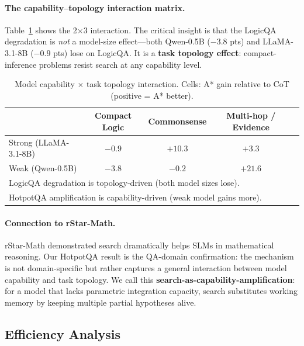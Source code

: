 \documentclass[11pt]{article}
\begin{document}
\paragraph{The capability--topology interaction matrix.}
Table~\ref{tab:interaction} shows the 2$\times$3 interaction. The critical insight is that the LogicQA degradation is \emph{not} a model-size effect—both Qwen-0.5B ($-3.8$ pts) and LLaMA-3.1-8B ($-0.9$ pts) lose on LogicQA. It is a \textbf{task topology effect}: compact-inference problems resist search at any capability level.

\begin{table}[t]
\centering
\caption{Model capability $\times$ task topology interaction. Cells: A* gain relative to CoT (positive = A* better).}
\label{tab:interaction}
\small
\begin{tabular}{lcccc}
\toprule
& \textbf{Compact Logic} & \textbf{Commonsense} & \textbf{Multi-hop / Evidence} \\
\midrule
Strong (LLaMA-3.1-8B) & $-0.9$ & $+10.3$ & $+3.3$ \\
Weak (Qwen-0.5B)      & $-3.8$ & $-0.2$  & $+21.6$ \\
\midrule
\multicolumn{4}{l}{\small LogicQA degradation is topology-driven (both model sizes lose).} \\
\multicolumn{4}{l}{\small HotpotQA amplification is capability-driven (weak model gains more).} \\
\bottomrule
\end{tabular}
\end{table}

\paragraph{Connection to rStar-Math.}
rStar-Math \citep{guan2025rstar} demonstrated search dramatically helps SLMs in mathematical reasoning. Our HotpotQA result is the QA-domain confirmation: the mechanism is not domain-specific but rather captures a general interaction between model capability and task topology. We call this \textbf{search-as-capability-amplification}: for a model that lacks parametric integration capacity, search substitutes working memory by keeping multiple partial hypotheses alive.

\subsection{Efficiency Analysis}
\label{sec:efficiency}
\end{document}
